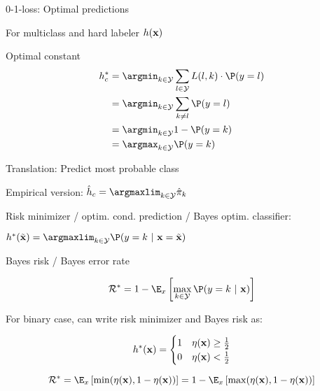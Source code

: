 \documentclass[11pt,compress,t,notes=noshow, xcolor=table]{beamer}
\begin{document}
\begin{framei}[sep=M]{0-1-loss: Optimal predictions}

\item For multiclass and hard labeler $h(\mathbf{x})$
\item Optimal constant
\begin{align*}   h_{c}^{\ast}  &= \argmin_{k \in \Yspace} \sum_{l \in \Yspace} L(l, k) \cdot \P(y = l) \\
&= \argmin_{k \in \Yspace} \sum_{k \ne l} \P(y = l) \\ 
  &= \argmin_{k \in \Yspace} 1 - \P(y = k) \\
  &= \argmax_{k \in \Yspace} \P(y = k)
  \end{align*}


\item Translation: Predict most probable class

\item Empirical version: $\hat{h}_c = \argmaxlim_{k \in \Yspace} \pikh$

\item Risk minimizer / optim. cond. prediction / Bayes optim. classifier:

 $h^{\ast}(\xtil) = \argmaxlim_{k \in \Yspace} \P(y = k~|~ \xv = \xtil)$ 

\end{framei}


\begin{framei}[sep=L]{Bayes risk  / Bayes error rate}

\item $$\riskbayes = 1 - \E_{x} \left[\max_{k \in \Yspace} \P(y = k~|~ \xv)\right]$$

\item For binary case, can write risk minimizer and Bayes risk as:  

$$
  h^{\ast}(\mathbf{x}) = \begin{cases} 1 & \eta(\mathbf{x}) \ge \frac{1}{2} \\ 0 & \eta(\mathbf{x}) < \frac{1}{2}\end{cases} 
$$

\item $$\riskbayes = \E_x\left[\min(\eta(\xv), 1 - \eta(\xv))\right] = 1 - \E_x\left[\max(\eta(\xv), 1 - \eta(\xv))\right] $$

 
\end{framei}
\end{document}
